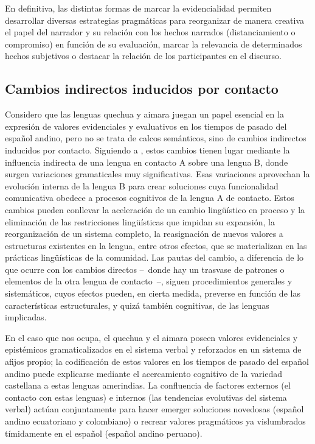 \documentclass[output=paper]{../langscibook}
\begin{document}
En definitiva, las distintas formas de marcar la evidencialidad permiten desarrollar diversas estrategias pragmáticas para reorganizar de manera creativa el papel del narrador y su relación con los hechos narrados (distanciamiento o compromiso) en función de su evaluación, marcar la relevancia de determinados hechos subjetivos o destacar la relación de los participantes en el discurso. 

 \subsection{Cambios indirectos inducidos por contacto}\label{sec:palacios:6.2}


Considero que las lenguas quechua y aimara juegan un papel esencial en la expresión de valores evidenciales y evaluativos en los tiempos de pasado del español andino, pero no se trata de calcos semánticos, sino de cambios indirectos inducidos por contacto. Siguiendo a \citet{PalaciosAlcaine2007idayvuelta,PalaciosAlcaine2011}, estos cambios tienen lugar mediante la influencia indirecta de una lengua en contacto A sobre una lengua B, donde surgen variaciones gramaticales muy significativas. Esas variaciones aprovechan la evolución interna de la lengua B para crear soluciones cuya funcionalidad comunicativa obedece a procesos cognitivos de la lengua A de contacto. Estos cambios pueden conllevar la aceleración de un cambio lingüístico en proceso y la eliminación de las restricciones lingüísticas que impidan su expansión, la reorganización de un sistema completo, la reasignación de nuevos valores a estructuras existentes en la lengua, entre otros efectos, que se materializan en las prácticas lingüísticas de la comunidad. Las pautas del cambio, a diferencia de lo que ocurre con los cambios directos -- donde hay un trasvase de patrones o elementos de la otra lengua de contacto --, siguen procedimientos generales y sistemáticos, cuyos efectos pueden, en cierta medida, preverse en función de las características estructurales, y quizá también cognitivas, de las lenguas implicadas.

En el caso que nos ocupa, el quechua y el aimara poseen valores evidenciales y epistémicos gramaticalizados en el sistema verbal y reforzados en un sistema de afijos propio; la codificación de estos valores en los tiempos de pasado del español andino puede explicarse mediante el acercamiento cognitivo de la variedad castellana a estas lenguas amerindias. La confluencia de factores externos (el contacto con estas lenguas) e internos (las tendencias evolutivas del sistema verbal) actúan conjuntamente para hacer emerger soluciones novedosas (español andino ecuatoriano y colombiano) o recrear valores pragmáticos ya vislumbrados tímidamente en el español (español andino peruano).
\end{document}
